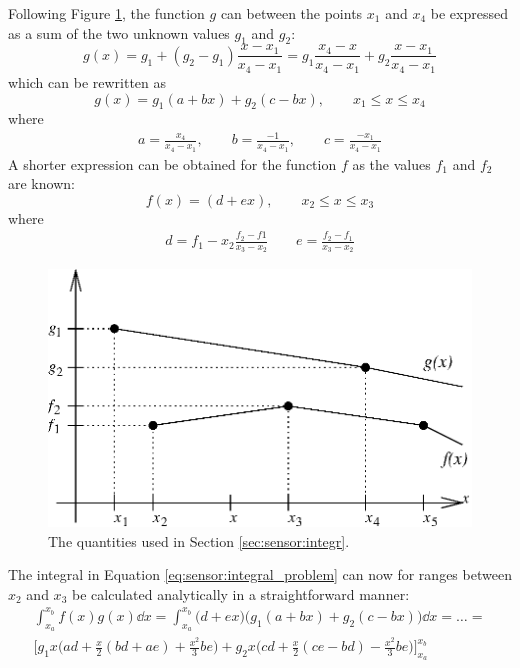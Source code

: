  Following Figure \ref{fig:sensor:vecintegr}, the function $g$ can between
 the points $x_1$ and $x_4$ be expressed as a sum of the two unknown
 values $g_1$ and $g_2$:
 \begin{equation}
   g(x) = g_1 + (g_2-g_1)\frac{x-x_1}{x_4-x_1} =
           g_1 \frac{x_4-x}{x_4-x_1} + g_2\frac{x-x_1}{x_4-x_1}
 \end{equation}
 which can be rewritten as
 \begin{equation}
   g(x) = g_1(a+bx)+g_2(c-bx), \qquad x_1 \leq x \leq x_4
 \end{equation}
 where
 \begin{eqnarray}
    a=\frac{x_4}{x_4-x_1}, \qquad b=\frac{-1}{x_4-x_1}, \qquad 
    c=\frac{-x_1}{x_4-x_1}   \nonumber
 \end{eqnarray} 
 A shorter expression can be obtained for the function $f$ as the
 values $f_1$ and $f_2$ are known:
 \begin{equation}
   f(x) = (d+ex), \qquad x_2 \leq x \leq x_3
 \end{equation}
 where 
 \begin{eqnarray}
    d=f_1-x_2\frac{f_2-f1}{x_3-x_2} \qquad e=\frac{f_2-f_1}{x_3-x_2} \nonumber
 \end{eqnarray}
 \begin{figure}[tb]
    \begin{center}
      \includegraphics*{Figs/vecintegr.eps}
      \caption{The quantities used in Section \ref{sec:sensor:integr}.}  
      \label{fig:sensor:vecintegr} 
    \end{center} 
 \end{figure}
 The integral in Equation \ref{eq:sensor:integral_problem} can now for
 ranges between $x_2$ and $x_3$ be calculated analytically in a
 straightforward manner:
 \begin{eqnarray}
    \int_{x_a}^{x_b}{f(x)g(x) \dd x} =
    \int_{x_a}^{x_b}{\big(d+ex\big)\big(g_1(a+bx)+g_2(c-bx)\big) \dd x}  
    =\dots= \nonumber\\
    \bigg[ g_1x\Big(ad+\frac{x}{2}(bd+ae)+\frac{x^2}{3}be\Big) + 
           g_2x\Big(cd+\frac{x}{2}(ce-bd)-\frac{x^2}{3}be \Big)
           \bigg]_{x_a}^{x_b}
    \label{eq:sensor:integr_weights}
 \end{eqnarray}
